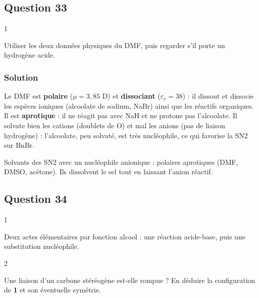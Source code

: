 \documentclass[11pt,a4paper]{article}
\begin{document}
\hypertarget{question-33}{%
\subsection{Question 33}\label{question-33}}

\begin{indication}{1}

Utiliser les deux données physiques du DMF, puis regarder s'il porte un hydrogène acide.

\end{indication}

\hypertarget{solution-32}{%
\subsubsection{Solution}\label{solution-32}}

Le DMF est \textbf{polaire} (\(\mu=3{,}85\) D) et \textbf{dissociant} (\(\varepsilon_r=38\)) : il dissout et dissocie les espèces ioniques (alcoolate de sodium, NaBr) ainsi que les réactifs organiques. Il est \textbf{aprotique} : il ne réagit pas avec NaH et ne protone pas l'alcoolate. Il solvate bien les cations (doublets de O) et mal les anions (pas de liaison hydrogène) : l'alcoolate, peu solvaté, est très nucléophile, ce qui favorise la SN2 sur BnBr.

\begin{methode}

Solvants des SN2 avec un nucléophile anionique : polaires aprotiques (DMF, DMSO, acétone). Ils dissolvent le sel tout en laissant l'anion réactif.

\end{methode}

\hypertarget{question-34}{%
\subsection{Question 34}\label{question-34}}

\begin{indication}{1}

Deux actes élémentaires par fonction alcool : une réaction acide-base, puis une substitution nucléophile.

\end{indication}

\begin{indication}{2}

Une liaison d'un carbone stéréogène est-elle rompue ? En déduire la configuration de \textbf{1} et son éventuelle symétrie.

\end{indication}
\end{document}
